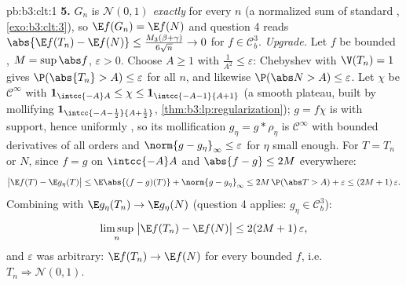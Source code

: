 \begin{solution}{pb:b3:clt:1}
\textbf{5.} $G_n$ is $\mathcal N(0,1)$ \emph{exactly} for
every $n$ (a normalized sum of  standard
, \cref{exo:b3:clt:3}), so $\E f(G_n) = \E f(N)$
and question 4 reads $\abs{\E f(T_n) - \E f(N)} \leq
\frac{M_3(\beta+\gamma)}{6\sqrt n} \to 0$ for $f \in
\mathcal C^3_b$. \emph{Upgrade.} Let $f$ be bounded
, $M = \sup\abs f$, $\varepsilon > 0$. Choose $A
\geq 1$ with $\frac1{A^2} \leq \varepsilon$: Chebyshev with
$\V(T_n) = 1$ gives $\P(\abs{T_n} > A) \leq \varepsilon$
for all $n$, and likewise $\P(\abs N > A) \leq \varepsilon$.
Let $\chi$ be $\mathcal C^\infty$ with
$\mathbf 1_{\intcc{-A}A} \leq \chi \leq
\mathbf 1_{\intcc{-A-1}{A+1}}$ (a smooth plateau, built by
mollifying $\mathbf 1_{\intcc{-A-\frac12}{A+\frac12}}$,
\cref{thm:b3:lp:regularization}); $g = f\chi$ is 
with  support, hence uniformly , so its
mollification $g_\eta = g * \rho_\eta$ is $\mathcal
C^\infty$ with bounded derivatives of all orders and
$\norm{g - g_\eta}_\infty \leq \varepsilon$ for $\eta$
small enough. For $T = T_n$ or $N$, since $f = g$ on
$\intcc{-A}A$ and $\abs{f - g} \leq 2M$ everywhere:
\[
\bigl|\E f(T) - \E g_\eta(T)\bigr| \leq
\E\abs{(f - g)(T)} + \norm{g - g_\eta}_\infty
\leq 2M\,\P(\abs T > A) + \varepsilon \leq
(2M + 1)\,\varepsilon .
\]
Combining with $\E g_\eta(T_n) \to \E g_\eta(N)$ (question
4 applies: $g_\eta \in \mathcal C^3_b$):
\[
\limsup_n\;\bigl|\E f(T_n) - \E f(N)\bigr| \leq
2(2M + 1)\,\varepsilon ,
\]
and $\varepsilon$ was arbitrary: $\E f(T_n) \to \E f(N)$ for
every bounded  $f$, i.e.\ $T_n \Rightarrow
\mathcal N(0,1)$.


\end{solution}
